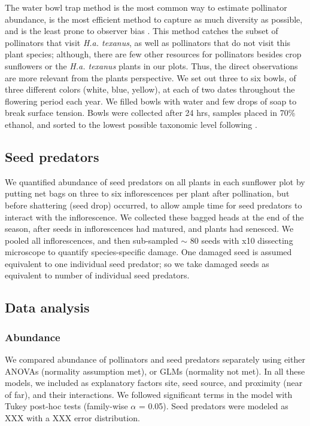 \documentclass[12pt]{article}
\begin{document}
The water bowl trap method is the most common way to estimate pollinator abundance, is the most efficient method to capture as much diversity as possible, and is the least prone to observer bias \citep{Westphal2008}.  This method catches the subset of pollinators that visit \textit{H.a. texanus}, as well as pollinators that do not visit this plant species; although, there are few other resources for pollinators besides crop sunflowers or the \textit{H.a. texanus} plants in our plots.  Thus, the direct observations are more relevant from the plants perspective.  We set out three to six bowls, of three different colors (white, blue, yellow), at each of two dates throughout the flowering period each year.  We filled bowls with water and few drops of soap to break surface tension.  Bowls were collected after 24 hrs, samples placed in 70\% ethanol, and sorted to the lowest possible taxonomic level following \citet{Michener2000}.    

\subsection{Seed predators}
We quantified abundance of seed predators on all plants in each sunflower plot by putting net bags on three to six inflorescences per plant after pollination, but before shattering (seed drop) occurred, to allow ample time for seed predators to interact with the inflorescence.  We collected these bagged heads at the end of the season, after seeds in inflorescences had matured, and plants had senesced. We pooled all inflorescences, and then sub-sampled $\sim$ 80 seeds with x10 dissecting microscope to quantify species-specific damage.  One damaged seed is assumed equivalent to one individual seed predator; so we take damaged seeds as equivalent to number of individual seed predators. 

\subsection{Data analysis}
\subsubsection{Abundance}  
We compared abundance of pollinators and seed predators separately using either ANOVAs (normality assumption met), or GLMs (normality not met).  In all these models, we included as explanatory factors site, seed source, and proximity (near of far), and their interactions.  We followed significant terms in the model with Tukey post-hoc tests (family-wise $\alpha$ = 0.05).  Seed predators were modeled as XXX with a XXX error distribution.  
\end{document}
